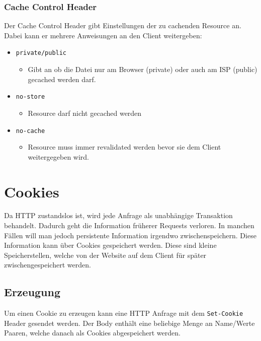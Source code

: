 \documentclass{article}
\begin{document}
	\subsubsection{Cache Control Header}
	Der Cache Control Header gibt Einstellungen der zu cachenden Resource an. Dabei kann er mehrere Anweisungen an den Client weitergeben:
	\begin{itemize}
		\item{\texttt{private/public}}
		\begin{itemize}
			\item{Gibt an ob die Datei nur am Browser (private) oder auch am ISP (public) gecached werden darf.}
		\end{itemize}
		\item{\texttt{no-store}}
		\begin{itemize}
			\item{Resource darf nicht gecached werden}
		\end{itemize}
		\item{\texttt{no-cache}}
		\begin{itemize}
			\item{Resource muss immer revalidated werden bevor sie dem Client weitergegeben wird.}
		\end{itemize}
	\end{itemize}
	\section{Cookies}
	Da HTTP zustandslos ist, wird jede Anfrage als unabhängige Transaktion behandelt. Dadurch geht die Information früherer Requests verloren. In manchen Fällen will man jedoch persistente Information irgendwo zwischenspeichern. Diese Information kann über Cookies gespeichert werden. Diese sind kleine Speicherstellen, welche von der Website auf dem Client für später zwischengespeichert werden.
	\subsection{Erzeugung}
	Um einen Cookie zu erzeugen kann eine HTTP Anfrage mit dem \texttt{Set-Cookie} Header gesendet werden. Der Body enthält eine beliebige Menge an Name/Werte Paaren, welche danach als Cookies abgespeichert werden. 
\end{document}
